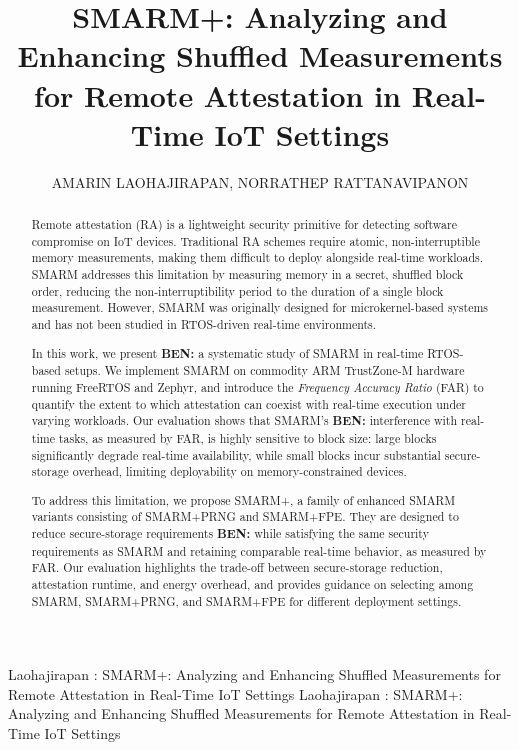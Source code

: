 \documentclass{ieeeaccess}
\DeclareRobustCommand{\ben}[1]{{\color{BENcolor}\textbf{BEN:} #1}}
\begin{document}

\title{SMARM+: Analyzing and Enhancing Shuffled Measurements for Remote Attestation in Real-Time IoT Settings}\author{\uppercase{Amarin Laohajirapan},
\uppercase{Norrathep Rattanavipanon}}

\address[1]{College of Computing, Prince of Songkla University, Phuket Campus, Phuket, Thailand (e-mail: 6730621007@psu.ac.th)}

\address[2]{College of Computing, Prince of Songkla University, Phuket Campus, Phuket, Thailand (e-mail: norrathep.r@psu.ac.th)}

\markboth
{Laohajirapan \headeretal: SMARM+: Analyzing and Enhancing Shuffled Measurements for Remote Attestation in Real-Time IoT Settings}
{Laohajirapan \headeretal: SMARM+: Analyzing and Enhancing Shuffled Measurements for Remote Attestation in Real-Time IoT Settings}



\begin{abstract}
Remote attestation (RA) is a lightweight security primitive for detecting software compromise on IoT devices. Traditional RA schemes require atomic, non-interruptible memory measurements, making them difficult to deploy alongside real-time workloads. SMARM addresses this limitation by measuring memory in a secret, shuffled block order, reducing the non-interruptibility period to the duration of a single block measurement. However, SMARM was originally designed for microkernel-based systems and has not been studied in RTOS-driven real-time environments.


In this work, we present \ben{a systematic study} of SMARM in real-time RTOS-based setups. We implement SMARM on commodity ARM TrustZone-M hardware running FreeRTOS and Zephyr, and introduce the \emph{Frequency Accuracy Ratio} (FAR) to quantify the extent to which attestation can coexist with real-time execution under varying workloads. Our evaluation shows that SMARM’s \ben{interference with real-time tasks, as measured by FAR,} is highly sensitive to block size: large blocks significantly degrade real-time availability, while small blocks incur substantial secure-storage overhead, limiting deployability on memory-constrained devices.

To address this limitation, we propose SMARM+, a family of enhanced SMARM variants consisting of SMARM+PRNG and SMARM+FPE. They are designed to reduce secure-storage requirements \ben{while satisfying the same security requirements as SMARM and retaining comparable real-time behavior, as measured by FAR}. Our evaluation highlights the trade-off between secure-storage reduction, attestation runtime, and energy overhead, and provides guidance on selecting among SMARM, SMARM+PRNG, and SMARM+FPE for different deployment settings.

\end{abstract}
\end{document}
